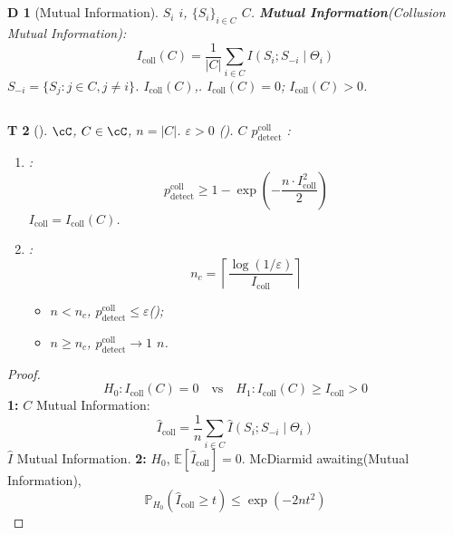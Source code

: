 \documentclass[12pt,a4paper]{article}
\newtheorem{theorem}Theorem[section]
\newtheorem{definition}[theorem]Definition
\theoremstyle{remark}
\newcommand{\E}{\mathbb{E}}
\newcommand{\Pbb}{\mathbb{P}}
\begin{document}
{\subsection{}
\begin{definition}[Mutual Information]
 $S_i$ $i$, $\{S_i\}_{i \in C}$ $C$.
\textbf{Mutual Information}(Collusion Mutual Information): 
\begin{equation}
 I_{\text{coll}}(C) = \frac{1}{|C|} \sum_{i \in C} I(S_i; S_{-i} \mid \Theta_i)
\end{equation}
 $S_{-i} = \{S_j : j \in C, j \neq i\}$.
$I_{\text{coll}}(C)$,.
 $I_{\text{coll}}(C) = 0$; $I_{\text{coll}}(C) > 0$.
\end{definition}
\subsection{}
\begin{theorem}[]\label{thm:collusion}
 $\cC$, $C \in \cC$, $n = |C|$.
 $\varepsilon > 0$ ().
 $C$ $p_{\text{detect}}^{\text{coll}}$ : 
\begin{enumerate}[label=(\roman*)]
 \item : 
 \begin{equation}\label{eq:coll_detect}
 p_{\text{detect}}^{\text{coll}} \geq 1 - \exp\left(-\frac{n \cdot I_{\text{coll}}^2}{2}\right)
 \end{equation}
 $I_{\text{coll}} = I_{\text{coll}}(C)$.
 \item : 
 \begin{equation}\label{eq:critical_n}
 n_c = \left\lceil \frac{\log(1/\varepsilon)}{I_{\text{coll}}} \right\rceil
 \end{equation}
 \begin{itemize}
 \item $n < n_c$, $p_{\text{detect}}^{\text{coll}} \leq \varepsilon$(); 
 \item $n \geq n_c$, $p_{\text{detect}}^{\text{coll}} \to 1$ $n$.
 \end{itemize}
\end{enumerate}
\end{theorem}
\begin{proof}
\[
H_0: I_{\text{coll}}(C) = 0 \quad \text{vs} \quad H_1: I_{\text{coll}}(C) \geq I_{\text{coll}} > 0
\]
\textbf{1:}
 $C$ Mutual Information: 
\[
\hat{I}_{\text{coll}} = \frac{1}{n} \sum_{i \in C} \hat{I}(S_i; S_{-i} \mid \Theta_i)
\]
 $\hat{I}$ Mutual Information.
\textbf{2:}
 $H_0$, $\E[\hat{I}_{\text{coll}}] = 0$. McDiarmid awaiting(Mutual Information), 
\[
\Pbb_{H_0}\left(\hat{I}_{\text{coll}} \geq t\right) \leq \exp\left(-2n t^2\right)
\]
\end{proof}}
\end{document}

